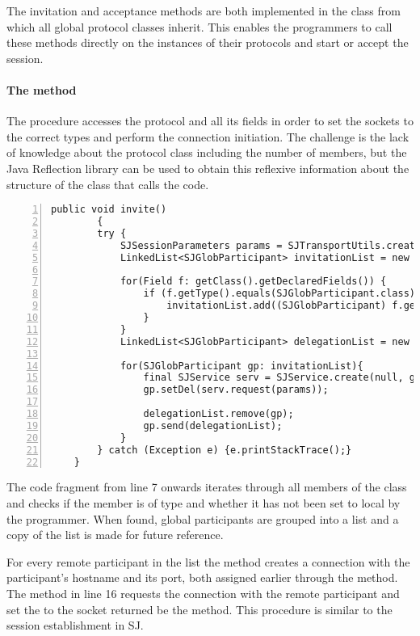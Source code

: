 The invitation and acceptance methods are both implemented in the  class from which all global protocol classes inherit. This enables the programmers to call these methods directly on the instances of their protocols and start or accept the session.

\paragraph*{The  method} The procedure accesses the protocol and all its  fields in order to set the sockets to the correct types and perform the connection initiation. The challenge is the lack of knowledge about the protocol class including the number of  members, but the Java Reflection library\cite{javareflect} can be used to obtain this reflexive information about the structure of the class that calls the code. 

\begin{lstlisting}[basicstyle=\LISTINGSTYLE, numbers=left, caption=The session initiation method]
	public void invite() 
		{
		try {
			SJSessionParameters params = SJTransportUtils.createSJSessionParameters("d", "d");
			LinkedList<SJGlobParticipant> invitationList = new LinkedList<SJGlobParticipant>();
		
			for(Field f: getClass().getDeclaredFields()) {		
				if (f.getType().equals(SJGlobParticipant.class) && (!((SJGlobParticipant) f.get(this)).isLocal())) {		
					invitationList.add((SJGlobParticipant) f.get(this));			
				}
			}
			LinkedList<SJGlobParticipant> delegationList = new LinkedList<SJGlobParticipant>(invitationList);
		
			for(SJGlobParticipant gp: invitationList){			
				final SJService serv = SJService.create(null, gp.getHostname(), gp.getRemPort());
				gp.setDel(serv.request(params));
					
				delegationList.remove(gp);
				gp.send(delegationList);
			}
		} catch (Exception e) {e.printStackTrace();} 
	}
\end{lstlisting}

The code fragment from line 7 onwards iterates through all members of the class and checks if the member is of type  and whether it has not been set to local by the programmer. When found, global participants are grouped into a list and a copy of the list is made for future reference.

For every remote participant in the list the  method creates a connection with the participant's hostname and its port, both assigned earlier through the  method. The method  in line 16 requests the connection with the remote participant and set the  to the socket returned be the  method. This procedure is similar to the session establishment in SJ.

